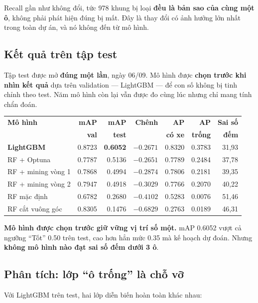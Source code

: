 \documentclass[12pt]{ai_conquer2026}
\begin{document}
Recall gần như không đổi, tức 978 khung bị loại \textbf{đều là bản sao của cùng một ô}, không phải phát hiện đúng bị mất. Đây là thay đổi có ảnh hưởng lớn nhất trong toàn dự án, và nó không đến từ mô hình.

\subsection{Kết quả trên tập test}

Tập test được mở \textbf{đúng một lần}, ngày 06/09. Mô hình được \textbf{chọn trước khi nhìn kết quả} dựa trên validation --- LightGBM --- để con số không bị tinh chỉnh theo test. Năm mô hình còn lại vẫn được đo cùng lúc nhưng chỉ mang tính chẩn đoán.

\begin{center}
\begin{tabular}{|l|r|r|r|r|r|r|}
\hline
\textbf{Mô hình} & \textbf{mAP} & \textbf{mAP} & \textbf{Chênh} & \textbf{AP} & \textbf{AP} & \textbf{Sai số} \\
 & \textbf{val} & \textbf{test} & & \textbf{có xe} & \textbf{trống} & \textbf{đếm} \\
\hline
\textbf{LightGBM} & 0.8723 & \textbf{0.6052} & $-0.2671$ & 0.8320 & 0.3783 & 31,93 \\
RF + Optuna & 0.7787 & 0.5136 & $-0.2651$ & 0.7789 & 0.2484 & 37,78 \\
RF + mining vòng 1 & 0.7868 & 0.4994 & $-0.2874$ & 0.7806 & 0.2181 & 39,35 \\
RF + mining vòng 2 & 0.7947 & 0.4918 & $-0.3029$ & 0.7766 & 0.2070 & 40,22 \\
RF mặc định & 0.6782 & 0.2680 & $-0.4102$ & 0.5283 & 0.0076 & 51,46 \\
RF cắt vuông góc & 0.8305 & 0.1476 & $-0.6829$ & 0.2763 & 0.0189 & 46,31 \\
\hline
\end{tabular}
\end{center}

\textbf{Mô hình được chọn trước giữ vững vị trí số một.} mAP 0.6052 vượt cả ngưỡng ``Tốt'' 0.50 trên test, cao hơn hẳn mức 0.35 mà kế hoạch dự đoán. Nhưng \textbf{không mô hình nào đạt sai số đếm dưới 3 ô}.

\subsection{Phân tích: lớp ``ô trống'' là chỗ vỡ}

Với LightGBM trên test, hai lớp diễn biến hoàn toàn khác nhau:
\end{document}
